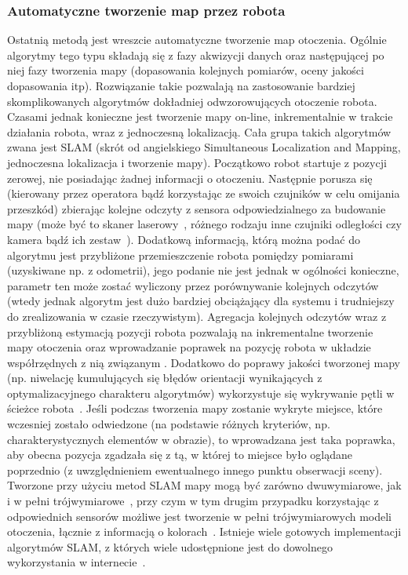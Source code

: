 \subsubsection{Automatyczne tworzenie map przez robota}

Ostatnią metodą jest wreszcie automatyczne tworzenie map otoczenia. Ogólnie
algorytmy tego typu składają się z fazy akwizycji danych oraz następującej
po niej fazy tworzenia mapy (dopasowania kolejnych pomiarów, oceny jakości
dopasowania itp). Rozwiązanie takie pozwalają na zastosowanie bardziej skomplikowanych
algorytmów dokładniej odwzorowujących otoczenie robota. Czasami jednak konieczne
jest tworzenie mapy on-line, inkrementalnie w trakcie działania robota,
wraz z jednoczesną lokalizacją. Cała grupa takich algorytmów zwana jest SLAM
(skrót od angielskiego Simultaneous Localization and Mapping, jednoczesna
lokalizacja i tworzenie mapy). Początkowo robot startuje z pozycji zerowej,
nie posiadając żadnej informacji o otoczeniu. Następnie porusza się (kierowany przez
operatora bądź korzystając ze swoich czujników w celu omijania przeszkód) zbierając
kolejne odczyty z sensora odpowiedzialnego za budowanie mapy (może być to skaner laserowy~\cite{laser_slam},
różnego rodzaju inne czujniki odległości czy kamera bądź ich zestaw~\cite{vslam}). Dodatkową
informacją, którą można podać do algorytmu jest przybliżone przemieszczenie robota
pomiędzy pomiarami (uzyskiwane np. z odometrii), jego podanie nie jest jednak w ogólności
konieczne, parametr ten może zostać wyliczony przez porównywanie kolejnych odczytów
(wtedy jednak algorytm jest dużo bardziej obciążający dla systemu i trudniejszy do zrealizowania
w czasie rzeczywistym). Agregacja kolejnych odczytów wraz z przybliżoną estymacją
pozycji robota pozwalają na inkrementalne tworzenie mapy otoczenia oraz wprowadzanie
poprawek na pozycję robota w układzie współrzędnych z nią związanym \cite{Dissanayake01asolution}.
Dodatkowo do poprawy jakości tworzonej mapy (np. niwelację kumulujących się błędów orientacji
wynikających z optymalizacyjnego charakteru algorytmów) wykorzystuje się wykrywanie pętli
w ścieżce robota~\cite{slam-loop}. Jeśli podczas tworzenia mapy zostanie wykryte
miejsce, które wczesniej zostało odwiedzone (na podstawie różnych kryteriów, np. charakterystycznych
elementów w obrazie), to wprowadzana jest taka poprawka, aby obecna pozycja zgadzała się
z tą, w której to miejsce było oglądane poprzednio (z uwzględnieniem ewentualnego
innego punktu obserwacji sceny). Tworzone przy użyciu metod SLAM mapy mogą być zarówno
dwuwymiarowe, jak i w pełni trójwymiarowe~\cite{6dslam}, przy czym w tym drugim przypadku
korzystając z odpowiednich sensorów możliwe jest tworzenie w pełni trójwymiarowych
modeli otoczenia, łącznie z informacją o kolorach~\cite{kinect_slam}.
Istnieje wiele gotowych implementacji algorytmów SLAM, z których wiele udostępnione
jest do dowolnego wykorzystania w internecie~\cite{openslam}.

